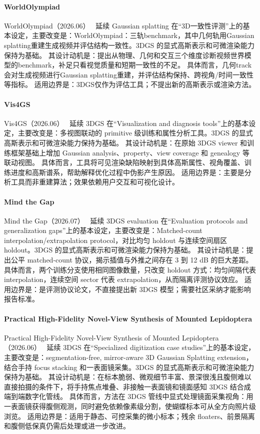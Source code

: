\paragraph{WorldOlympiad}
WorldOlympiad（2026.06）~\cite{2606_11129} 延续 Gaussian splatting 在“3D一致性评测”上的基本设定，主要改变是：WorldOlympiad：三轨benchmark，其中几何轨用Gaussian splatting重建生成视频并评估结构一致性。3DGS 的显式高斯表示和可微渲染能力保持为基础。
其设计动机是：提出从物理、几何和交互三个维度诊断视频世界模型的benchmark，补足只看视觉质量和短期一致性的不足。
具体而言，几何track会对生成视频进行Gaussian splatting重建，并评估结构保持、跨视角/时间一致性等指标。
适用边界是：3DGS仅作为评估工具；不提出新的高斯表示或渲染方法。

\paragraph{Vis4GS}
Vis4GS（2026.06）~\cite{2606_26985} 延续 3DGS 在“Visualization and diagnosis tools”上的基本设定，主要改变是：多视图联动的 primitive 级训练和属性分析工具。3DGS 的显式高斯表示和可微渲染能力保持为基础。
其设计动机是：在原始 3DGS viewer 和训练框架基础上增加 Gaussian analysis、property、view coverage 和 genealogy 等联动视图。
具体而言，工具将可见渲染缺陷映射到具体高斯属性、视角覆盖、训练进度和高斯谱系，帮助解释优化过程中伪影产生原因。
适用边界是：主要是分析工具而非重建算法；效果依赖用户交互和可视化设计。

\paragraph{Mind the Gap}
Mind the Gap（2026.07）~\cite{2607_01556} 延续 3DGS evaluation 在“Evaluation protocols and generalization gaps”上的基本设定，主要改变是：Matched-count interpolation/extrapolation protocol，对比均匀 holdout 与连续空间扇区 holdout。3DGS 的显式高斯表示和可微渲染能力保持为基础。
其设计动机是：提出公平 matched-count 协议，揭示插值与外推之间存在 3 到 12 dB 的巨大差距。
具体而言，两个训练分支使用相同图像数量，只改变 holdout 方式：均匀间隔代表 interpolation，连续空间 sector 代表 extrapolation，从而隔离评测协议效应。
适用边界是：是评测协议论文，不直接提出新 3DGS 模型；需要社区采纳才能影响报告标准。

\paragraph{Practical High-Fidelity Novel-View Synthesis of Mounted Lepidoptera}
Practical High-Fidelity Novel-View Synthesis of Mounted Lepidoptera（2026.06）~\cite{2606_31679} 延续 3DGS 在“Specialized digitization case studies”上的基本设定，主要改变是：segmentation-free, mirror-aware 3D Gaussian Splatting extension，结合手持 focus stacking 和一表面镜采集。3DGS 的显式高斯表示和可微渲染能力保持为基础。
其设计动机是：在标本脆弱、微观细节丰富、景深很浅且腹侧难以直接拍摄的条件下，将手持焦点堆叠、非接触一表面镜和镜面感知 3DGS 结合成端到端数字化管线。
具体而言，方法在 3DGS 管线中显式处理镜面采集视角：用一表面镜获得腹侧观测，同时避免依赖像素级分割，使蝴蝶标本可从全方向照片级浏览。
适用边界是：适用于静态、可控采集的微小标本；残余 floaters、前景隔离和腹侧低保真仍需后处理或进一步改进。
